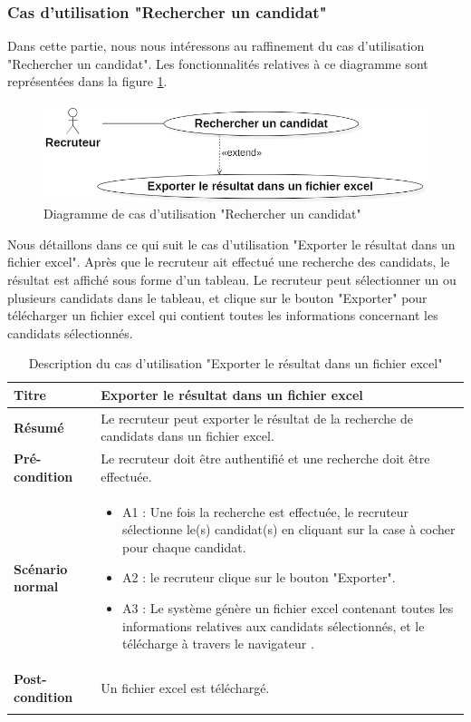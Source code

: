 \subsubsection{Cas d'utilisation "Rechercher un candidat"}
Dans cette partie, nous nous intéressons au raffinement du cas d'utilisation "Rechercher un candidat". Les fonctionnalités relatives à ce diagramme sont représentées dans la figure \ref{fig:recherche_candidat}.
\begin{figure}[H]
     \centering
     \includegraphics[scale=0.6]{img/raffinement recherche candidat.png}
     \caption{Diagramme de cas d'utilisation "Rechercher un candidat"}
     \label{fig:recherche_candidat}
 \end{figure}
 Nous détaillons dans ce qui suit le cas d'utilisation "Exporter le résultat dans un fichier excel". Après que le recruteur ait effectué une recherche des candidats, le résultat est affiché sous forme d'un tableau. Le recruteur peut sélectionner un ou plusieurs candidats dans le tableau, et clique sur le bouton "Exporter" pour télécharger un fichier excel qui contient toutes les informations concernant les candidats sélectionnés. 
 \newpage
   \begin{longtable}[c]{
    |p{}|
    |p{}|
}
    \hline
    \textbf{Titre}
    &   Exporter le résultat dans un fichier excel\\
    \hline
    \textbf{Résumé}
    & Le recruteur peut exporter le résultat de la recherche de candidats dans un fichier excel. \\
    \hline
     \textbf{Pré-condition}
    & Le recruteur doit être authentifié et une recherche doit être effectuée.\\
    \hline
     \textbf{Scénario normal}
    & \begin{itemize}
        \item A1 : Une fois la recherche est effectuée, le recruteur sélectionne le(s) candidat(s) en cliquant sur la case à cocher pour chaque candidat. 
        \item A2 : le recruteur clique sur le bouton "Exporter".
        \item A3 : Le système génère un fichier excel contenant toutes les informations relatives aux candidats sélectionnés, et le télécharge à travers le navigateur .
    \end{itemize}\\
    \hline
    \textbf{Post-condition}
    & Un fichier excel est téléchargé.\\
    \hline
\caption{Description du cas d'utilisation "Exporter le résultat dans un fichier excel"}
\label{tab:recherche_candidat}
\end{longtable}
